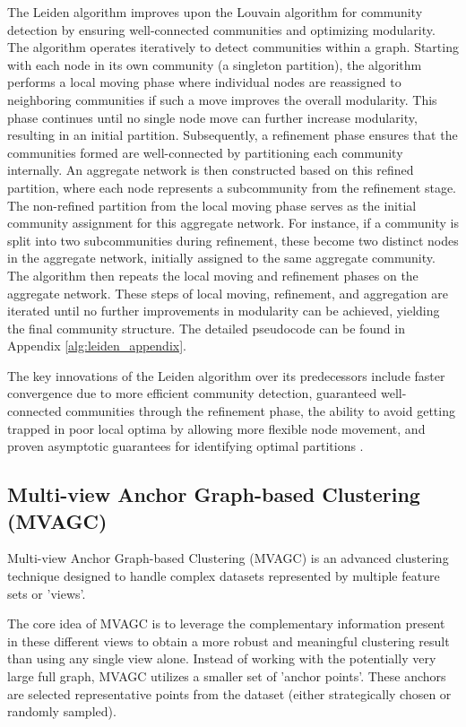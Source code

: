 The Leiden algorithm improves upon the Louvain algorithm for community detection by ensuring well-connected communities and optimizing modularity. The algorithm operates iteratively to detect communities within a graph. Starting with each node in its own community (a singleton partition), the algorithm performs a local moving phase where individual nodes are reassigned to neighboring communities if such a move improves the overall modularity. This phase continues until no single node move can further increase modularity, resulting in an initial partition. Subsequently, a refinement phase ensures that the communities formed are well-connected by partitioning each community internally. An aggregate network is then constructed based on this refined partition, where each node represents a subcommunity from the refinement stage. The non-refined partition from the local moving phase serves as the initial community assignment for this aggregate network. For instance, if a community is split into two subcommunities during refinement, these become two distinct nodes in the aggregate network, initially assigned to the same aggregate community. The algorithm then repeats the local moving and refinement phases on the aggregate network. These steps of local moving, refinement, and aggregation are iterated until no further improvements in modularity can be achieved, yielding the final community structure. The detailed pseudocode can be found in Appendix \ref{alg:leiden_appendix}.

The key innovations of the Leiden algorithm over its predecessors include faster convergence due to more efficient community detection, guaranteed well-connected communities through the refinement phase, the ability to avoid getting trapped in poor local optima by allowing more flexible node movement, and proven asymptotic guarantees for identifying optimal partitions \cite{traag2019leiden}.


\subsection{Multi-view Anchor Graph-based Clustering (MVAGC)}
\label{subsec:MVAGC}

Multi-view Anchor Graph-based Clustering (MVAGC) is an advanced clustering technique designed to handle complex datasets represented by multiple feature sets or 'views'. 

The core idea of MVAGC is to leverage the complementary information present in these different views to obtain a more robust and meaningful clustering result than using any single view alone. Instead of working with the potentially very large full graph, MVAGC utilizes a smaller set of 'anchor points'. These anchors are selected representative points from the dataset (either strategically chosen or randomly sampled).

